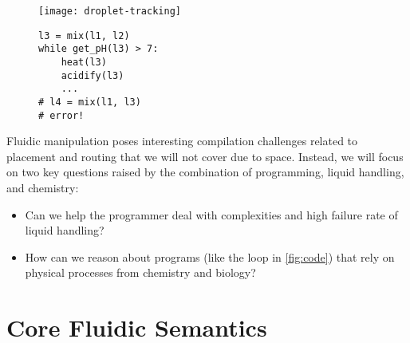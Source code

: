 \documentclass[
  10pt,
  a4paper,
  twocolumn,
]{article}
\begin{document}
\begin{figure}
  \begin{minipage}{0.4\linewidth}
    \footnotesize
    \centering
    \texttt{[image: droplet-tracking]}
  \end{minipage}
  \hfill
  \begin{minipage}{0.5\linewidth}
    \begin{verbatim}
l3 = mix(l1, l2)
while get_pH(l3) > 7:
    heat(l3)
    acidify(l3)
    ...
# l4 = mix(l1, l3)
# error!
    \end{verbatim}
  \end{minipage}
  \label{fig:board}
  \vspace{-1em}
  \label{fig:code}
\end{figure}

Fluidic manipulation poses interesting compilation challenges related to placement and routing that we will not cover due to space.
Instead, we will focus on two key questions raised by the combination of programming, liquid handling, and chemistry:
\begin{itemize}
\item Can we help the programmer deal with complexities and high failure rate of liquid handling?
\item How can we reason about programs (like the loop in \autoref{fig:code}) that rely on physical processes from chemistry and biology?
\end{itemize}





\section*{Core Fluidic Semantics}
\end{document}
